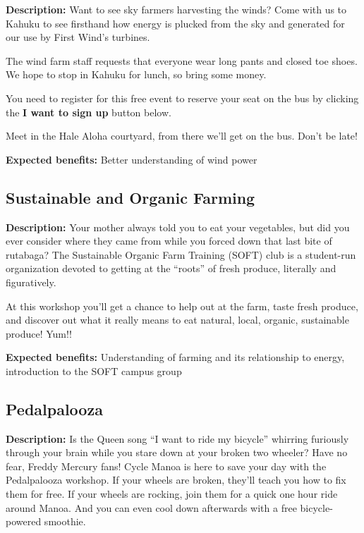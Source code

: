 \textbf{Description:} Want to see sky farmers harvesting the winds? Come with us to Kahuku to see firsthand how energy is plucked from the sky and generated for our use by First Wind's turbines.

The wind farm staff requests that everyone wear long pants and closed toe shoes.  We hope to stop in Kahuku for lunch, so bring some money.

You need to register for this free event to reserve your seat on the bus by clicking the \textbf{I want to sign up} button below.

Meet in the Hale Aloha courtyard, from there we'll get on the bus.  Don't be late!

\vspace{2ex}
\textbf{Expected benefits:} Better understanding of wind power


\subsection{Sustainable and Organic Farming}

\textbf{Description:} Your mother always told you to eat your vegetables, but did you ever consider where they came from while you forced down that last bite of rutabaga? The Sustainable Organic Farm Training (SOFT) club is a student-run organization devoted to getting at the ``roots'' of fresh produce, literally and figuratively. 

At this workshop you'll get a chance to help out at the farm, taste fresh produce, and discover out what it really means to eat natural, local, organic, sustainable produce! Yum!!

\vspace{2ex}
\textbf{Expected benefits:} Understanding of farming and its relationship to energy, introduction to the SOFT campus group


\subsection{Pedalpalooza}

\textbf{Description:} Is the Queen song ``I want to ride my bicycle'' whirring furiously through your brain while you stare down at your broken two wheeler? Have no fear, Freddy Mercury fans! Cycle Manoa is here to save your day with the Pedalpalooza workshop. If your wheels are broken, they'll teach you how to fix them for free. If your wheels are rocking, join them for a quick one hour ride around Manoa. And you can even cool down afterwards with a free bicycle-powered smoothie.

